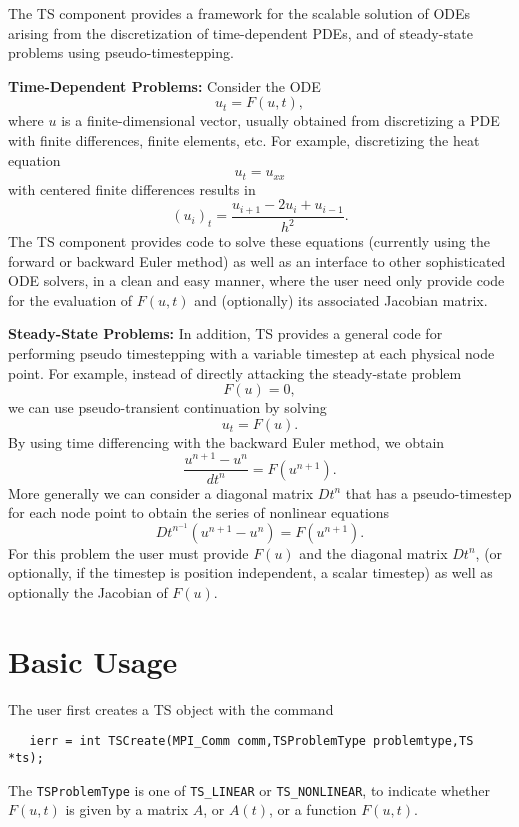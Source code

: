 { 
The TS component provides a framework for the scalable solution of ODEs
arising from the discretization of time-dependent PDEs, and of
steady-state problems using pseudo-timestepping.

\vspace{.2cm}

\noindent
{\bf Time-Dependent Problems:} Consider the ODE
\[
              u_t = F(u,t),
\]
where $ u $ is a finite-dimensional vector, usually obtained from
discretizing a PDE with finite differences, finite elements, etc.
For example, discretizing the heat equation 
\[
          u_t = u_{xx} 
\]
with centered finite differences results in 
\[
          (u_i)_t = \frac{u_{i+1} - 2 u_{i} + u_{i-1}}{h^2}.
\]
The TS component provides code to solve these equations (currently 
using the forward or backward Euler method) as well as an interface to 
other sophisticated ODE solvers, in a clean and easy manner,
where the user need only provide code for the evaluation of $ F(u,t) $ and 
(optionally) its associated Jacobian matrix.

\vspace{.2cm}

\noindent
{\bf Steady-State Problems:} 
In addition, TS provides a general code for performing pseudo timestepping
with a variable timestep at each physical node point. For example, instead of
directly attacking the steady-state problem
\[
           F(u) = 0,
\]
we can use pseudo-transient continuation by solving
\[
           u_t = F(u).
\]
By using time differencing with the backward Euler method, we obtain
\[
           \frac{u^{n+1} - u^{n}}{dt^{n}} = F(u^{n+1}).
\]
More generally we can consider a diagonal matrix $ Dt^{n} $ that has a
pseudo-timestep for each node point to obtain the series of nonlinear equations
\[
        Dt^{n^{-1}}(u^{n+1} - u^{n}) =  F(u^{n+1}).
\]
For this problem the user must provide $ F(u) $ and the diagonal 
matrix $ Dt^{n} $, (or optionally, if the timestep is position independent,
a scalar timestep) as well as optionally the Jacobian of $ F(u).$ 

\section{Basic Usage}

The user first creates a TS object with the command
\begin{verbatim}
   ierr = int TSCreate(MPI_Comm comm,TSProblemType problemtype,TS *ts);
\end{verbatim}
 The {\tt TSProblemType} 
is one of {\tt TS\_LINEAR} or {\tt TS\_NONLINEAR},
to indicate whether $ F(u,t) $ is given by a matrix $ A $, or $ A(t) $, or a
function $ F(u,t). $

}
